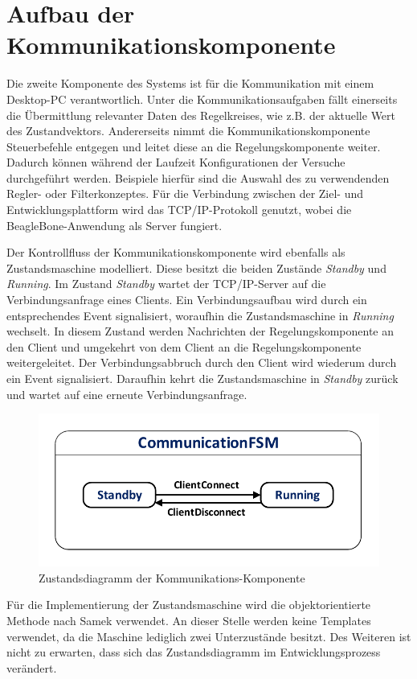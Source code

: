 \section{Aufbau der Kommunikationskomponente}
Die zweite Komponente des Systems ist für die Kommunikation mit einem Desktop-PC verantwortlich. Unter die Kommunikationsaufgaben fällt einerseits die Übermittlung relevanter Daten des Regelkreises, wie z.B. der aktuelle Wert des Zustandvektors. Andererseits nimmt die Kommunikationskomponente Steuerbefehle entgegen und leitet diese an die Regelungskomponente weiter. Dadurch können während der Laufzeit Konfigurationen der Versuche durchgeführt werden. Beispiele hierfür sind die Auswahl des zu verwendenden Regler- oder Filterkonzeptes. Für die Verbindung zwischen der Ziel- und Entwicklungsplattform wird das TCP/IP-Protokoll genutzt, wobei die BeagleBone-Anwendung als Server fungiert.

Der Kontrollfluss der Kommunikationskomponente wird ebenfalls als Zustandsmaschine modelliert. Diese besitzt die beiden Zustände \textit{Standby} und \textit{Running}. Im Zustand \textit{Standby} wartet der TCP/IP-Server auf die Verbindungsanfrage eines Clients. Ein Verbindungsaufbau wird durch ein entsprechendes Event signalisiert, woraufhin die Zustandsmaschine in \textit{Running} wechselt. In diesem Zustand werden Nachrichten der Regelungskomponente an den Client und umgekehrt von dem Client an die Regelungskomponente weitergeleitet. Der Verbindungsabbruch durch den Client wird wiederum durch ein Event signalisiert. Daraufhin kehrt die Zustandsmaschine in \textit{Standby} zurück und wartet auf eine erneute Verbindungsanfrage.
\begin{figure}[h!]
\centering
\includegraphics[width=0.7\linewidth]{img/SW_4_CommComp_SC.pdf}
\caption{Zustandsdiagramm der Kommunikations-Komponente}
\end{figure}
Für die Implementierung der Zustandsmaschine wird die objektorientierte Methode nach Samek verwendet. An dieser Stelle werden keine Templates verwendet, da die Maschine lediglich zwei Unterzustände besitzt. Des Weiteren ist nicht zu erwarten, dass sich das Zustandsdiagramm im Entwicklungsprozess verändert.

